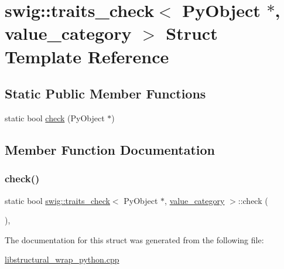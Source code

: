 \hypertarget{structswig_1_1traits__check_3_01_py_object_01_5_00_01value__category_01_4}{}\section{swig\+:\+:traits\+\_\+check$<$ Py\+Object $\ast$, value\+\_\+category $>$ Struct Template Reference}
\label{structswig_1_1traits__check_3_01_py_object_01_5_00_01value__category_01_4}
\subsection*{Static Public Member Functions}
\begin{DoxyCompactItemize}
\item 
static bool \hyperlink{structswig_1_1traits__check_3_01_py_object_01_5_00_01value__category_01_4_a4242a4f3371216574fd46f69b5fa0a23}{check} (Py\+Object $\ast$)
\end{DoxyCompactItemize}


\subsection{Member Function Documentation}
\mbox{\label{structswig_1_1traits__check_3_01_py_object_01_5_00_01value__category_01_4_a4242a4f3371216574fd46f69b5fa0a23}} 
\subsubsection{\texorpdfstring{check()}{check()}}
{\footnotesize\ttfamily static bool \hyperlink{structswig_1_1traits__check}{swig\+::traits\+\_\+check}$<$ Py\+Object $\ast$, \hyperlink{structswig_1_1value__category}{value\+\_\+category} $>$\+::check (\begin{DoxyParamCaption}\item[{Py\+Object $\ast$}]{ }\end{DoxyParamCaption})\hspace{0.3cm}{\ttfamily [inline]}, {\ttfamily [static]}}



The documentation for this struct was generated from the following file\+:\begin{DoxyCompactItemize}
\item 
\hyperlink{libstructural__wrap__python_8cpp}{libstructural\+\_\+wrap\+\_\+python.\+cpp}\end{DoxyCompactItemize}
